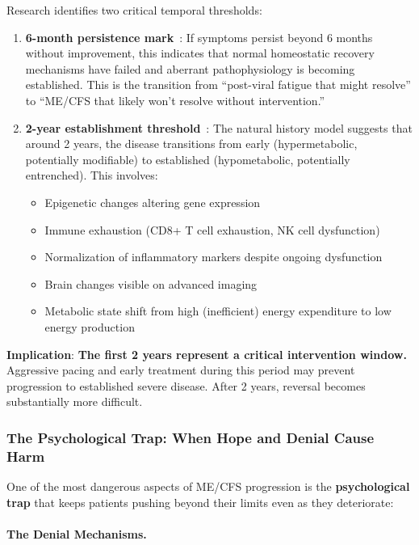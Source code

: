 Research identifies two critical temporal thresholds:

\begin{enumerate}
    \item \textbf{6-month persistence mark}~\cite{Maksoud2020natural}: If symptoms persist beyond 6 months without improvement, this indicates that normal homeostatic recovery mechanisms have failed and aberrant pathophysiology is becoming established. This is the transition from ``post-viral fatigue that might resolve'' to ``ME/CFS that likely won't resolve without intervention.''

    \item \textbf{2-year establishment threshold}~\cite{Maksoud2020natural}: The natural history model suggests that around 2 years, the disease transitions from early (hypermetabolic, potentially modifiable) to established (hypometabolic, potentially entrenched). This involves:
    \begin{itemize}
        \item Epigenetic changes altering gene expression
        \item Immune exhaustion (CD8+ T cell exhaustion, NK cell dysfunction)
        \item Normalization of inflammatory markers despite ongoing dysfunction
        \item Brain changes visible on advanced imaging
        \item Metabolic state shift from high (inefficient) energy expenditure to low energy production
    \end{itemize}
\end{enumerate}

\textbf{Implication}: \textbf{The first 2 years represent a critical intervention window.} Aggressive pacing and early treatment during this period may prevent progression to established severe disease. After 2 years, reversal becomes substantially more difficult.

\subsubsection{The Psychological Trap: When Hope and Denial Cause Harm}
\label{sec:psychological-trap}

One of the most dangerous aspects of ME/CFS progression is the \textbf{psychological trap} that keeps patients pushing beyond their limits even as they deteriorate:

\paragraph{The Denial Mechanisms.}

